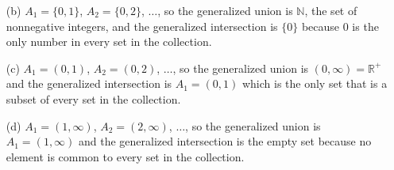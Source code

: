 \documentclass{article}
\begin{document}
\begin{enumerate}
\begin{itemize}
            \item[(b)] $A_1 = \{ 0, 1\}$, $A_2 = \{0, 2\}$, $\ldots$, so the generalized union is $\mathbb{N}$, the set of nonnegative integers, and the generalized intersection is $\{ 0\}$ because $0$ is the only number in every set in the collection.\\
            \item[(c)] $A_1 = (0,1)$, $A_2 = (0,2)$, $\ldots$, so the generalized union is $(0,\infty) = \mathbb{R}^+$ and the generalized intersection is $A_1 = (0,1)$ which is the only set that is a subset of every set in the collection.\\
            \item[(d)] $A_1 = (1,\infty)$, $A_2 = (2,\infty)$, $\ldots$, so the generalized union is $A_1 = (1,\infty)$ and the generalized intersection is the empty set because no element is common to every set in the collection.\\
        \end{itemize}
\end{enumerate}
\end{document}
